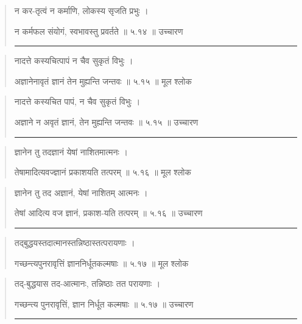 \begin{quotation}

न कर-तृत्वं न कर्माणि, लोकस्य सृजति प्रभुः  ।  

न कर्मफल संयोगं, स्वभावस्तु प्रवर्तते  ॥ ५.१४ ॥  उच्चारण

\noindent\rule{16cm}{0.4pt} 
\end{quotation}


\begin{quotation}  

नादत्ते कस्यचित्पापं न चैव सुकृतं विभुः  ।  

अज्ञानेनावृतं ज्ञानं तेन मुह्यन्ति जन्तवः  ॥ ५.१५ ॥  मूल श्लोक
\end{quotation}

\begin{quotation}

नादत्ते कस्यचित पापं, न चैव सुकृतं विभुः  ।  

अज्ञाने न अवृतं ज्ञानं, तेन मुह्यन्ति जन्तवः  ॥ ५.१५ ॥  उच्चारण

\noindent\rule{16cm}{0.4pt} 
\end{quotation}


\begin{quotation}  

ज्ञानेन तु तदज्ञानं येषां नाशितमात्मनः  ।  

तेषामादित्यवज्ज्ञानं प्रकाशयति तत्परम्‌  ॥ ५.१६ ॥  मूल श्लोक
\end{quotation}

\begin{quotation}

ज्ञानेन तु तद अज्ञानं, येषां नाशितम् आत्मनः  ।  

तेषां आदित्य वज ज्ञानं, प्रकाश-यति तत्परम्‌  ॥ ५.१६ ॥  उच्चारण

\noindent\rule{16cm}{0.4pt} 
\end{quotation}


\begin{quotation}  

तद्‍बुद्धयस्तदात्मानस्तन्निष्ठास्तत्परायणाः  ।  

गच्छन्त्यपुनरावृत्तिं ज्ञाननिर्धूतकल्मषाः  ॥ ५.१७ ॥  मूल श्लोक
\end{quotation}

\begin{quotation}
तद्‍-बुद्धयास तद-आत्मानः, तन्निष्ठाः तत परायणाः  ।  

गच्छन्त्य पुनरावृत्तिं, ज्ञान निर्धूत कल्मषाः  ॥ ५.१७ ॥  उच्चारण

\noindent\rule{16cm}{0.4pt} 
\end{quotation}


